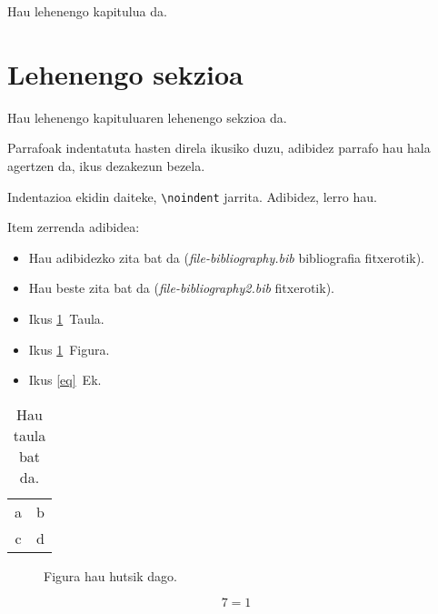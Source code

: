 
Hau lehenengo kapitulua da.

\section{Lehenengo sekzioa}

Hau lehenengo kapituluaren lehenengo sekzioa da.

Parrafoak indentatuta hasten direla ikusiko duzu, adibidez parrafo hau hala agertzen da, ikus dezakezun bezela.

\noindent Indentazioa ekidin daiteke, \verb#\noindent# jarrita. Adibidez, lerro hau.

\noindent Item zerrenda adibidea:

\begin{itemize}
 \item Hau adibidezko zita bat da\cite{ko:04} (\textit{file-bibliography.bib} bibliografia fitxerotik).
 \item Hau beste zita bat da\cite{hi:08} (\textit{file-bibliography2.bib} fitxerotik).
 \item Ikus \ref{tab}~Taula.
 \item Ikus \ref{fig}~Figura.
 \item Ikus \ref{eq}~Ek.
\end{itemize}

\begin{table}[hbt]
 \begin{center}
 \begin{tabular}{cc}
  a & b \\
  c & d 
 \end{tabular}
 \end{center}
 \caption{Hau taula bat da.}
 \label{tab}
\end{table}

\begin{figure}[hbt]
 \begin{center}
 \end{center}
 \caption{Figura hau hutsik dago.}
 \label{fig}
\end{figure}

\begin{equation}
  7 = 1
 \label{eq}
\end{equation}
